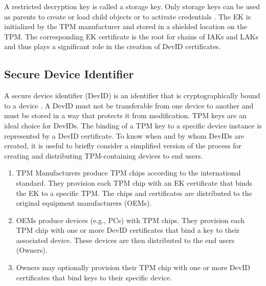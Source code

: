 \documentclass[runningheads]{llncs}
\begin{document}
A restricted decryption key is called a storage key. Only storage keys
can be used as parents to create or load child objects or to activate
credentials \citep{PracticalGuide}. The EK is initialized by the TPM
manufacturer and stored in a shielded location on the TPM. The
corresponding EK certificate is the root for chains of IAKs and LAKs
and thus plays a significant role in the creation of DevID
certificates.





\subsection{Secure Device Identifier}
A secure device identifier (DevID) is an identifier that is
cryptographically bound to a device \citep{DevIDSpec-IEEE}. A DevID
must not be transferable from one device to another and must be stored
in a way that protects it from modification. TPM keys are an ideal
choice for DevIDs.  The binding of a TPM key to a specific device
instance is represented by a DevID certificate.  To know when and by
whom DevIDs are created, it is useful to briefly consider a simplified
version of the process for creating and distributing TPM-containing
devices to end users.

\begin{enumerate}
\item\label{ite:idTPM} TPM Manufacturers produce TPM chips according
  to the international standard. They provision each TPM chip with an
  EK certificate that binds the EK to a specific TPM. The chips and
  certificates are distributed to the original equipment
  manufacturers (OEMs).
\item\label{ite:idDevIni} OEMs produce devices (e.g., PCs) with TPM
  chips. They provision each TPM chip with one or more DevID
  certificates that bind a key to their associated device. These
  devices are then distributed to the end users (Owners).
\item\label{ite:idDevLoc} Owners may optionally provision their TPM
  chip with one or more DevID certificates that bind keys to their
  specific device. 
\end{enumerate} 
\end{document}
